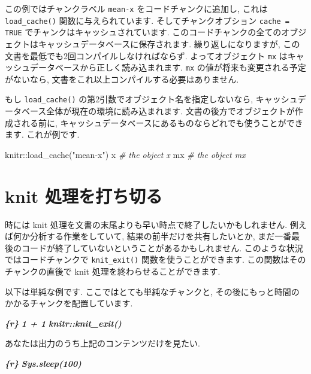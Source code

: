 \documentclass[
  11pt,
]{bxjsreport}
\newenvironment{Shaded}{\begin{snugshade}}{\end{snugshade}}
\newcommand{\CommentTok}[1]{\textcolor[rgb]{0.56,0.35,0.01}{\textit{#1}}}
\newcommand{\FunctionTok}[1]{\textcolor[rgb]{0.00,0.00,0.00}{#1}}
\newcommand{\InformationTok}[1]{\textcolor[rgb]{0.56,0.35,0.01}{\textbf{\textit{#1}}}}
\newcommand{\NormalTok}[1]{#1}
\newcommand{\SpecialCharTok}[1]{\textcolor[rgb]{0.00,0.00,0.00}{#1}}
\newcommand{\StringTok}[1]{\textcolor[rgb]{0.31,0.60,0.02}{#1}}
\begin{document}
この例ではチャンクラベル \texttt{mean-x} をコードチャンクに追加し, これは \texttt{load\_cache()} 関数に与えられています. そしてチャンクオプション \texttt{cache = TRUE} でチャンクはキャッシュされています. このコードチャンクの全てのオブジェクトはキャッシュデータベースに保存されます. 繰り返しになりますが, この文書を最低でも2回コンパイルしなければならず. よってオブジェクト \texttt{mx} はキャッシュデータベースから正しく読み込まれます. \texttt{mx} の値が将来も変更される予定がないなら, 文書をこれ以上コンパイルする必要はありません.

もし \texttt{load\_cache()} の第2引数でオブジェクト名を指定しないなら, キャッシュデータベース全体が現在の環境に読み込まれます. 文書の後方でオブジェクトが作成される前に, キャッシュデータベースにあるものならどれでも使うことができます. これが例です.

\begin{Shaded}
\begin{Highlighting}[numbers=left,,]
\NormalTok{knitr}\SpecialCharTok{::}\FunctionTok{load\_cache}\NormalTok{(}\StringTok{"mean{-}x"}\NormalTok{)}
\NormalTok{x  }\CommentTok{\# the object \textasciigrave{}x\textasciigrave{}}
\NormalTok{mx  }\CommentTok{\# the object \textasciigrave{}mx\textasciigrave{}}
\end{Highlighting}
\end{Shaded}

\hypertarget{knit-exit}{%
\section{knit 処理を打ち切る}\label{knit-exit}}

時には knit 処理を文書の末尾よりも早い時点で終了したいかもしれません. 例えば何か分析する作業をしていて, 結果の前半だけを共有したいとか, まだ一番最後のコードが終了していないということがあるかもしれません. このような状況ではコードチャンクで \texttt{knit\_exit()} 関数を使うことができます. この関数はそのチャンクの直後で knit 処理を終わらせることができます.

以下は単純な例です. ここではとても単純なチャンクと, その後にもっと時間のかかるチャンクを配置しています.

\begin{Shaded}
\begin{Highlighting}[]
\InformationTok{\textasciigrave{}\textasciigrave{}\textasciigrave{}\{r\}}
\InformationTok{1 + 1}
\InformationTok{knitr::knit\_exit()}
\InformationTok{\textasciigrave{}\textasciigrave{}\textasciigrave{}}

\NormalTok{あなたは出力のうち上記のコンテンツだけを見たい.}

\InformationTok{\textasciigrave{}\textasciigrave{}\textasciigrave{}\{r\}}
\InformationTok{Sys.sleep(100)}
\InformationTok{\textasciigrave{}\textasciigrave{}\textasciigrave{}}
\end{Highlighting}
\end{Shaded}
\end{document}
